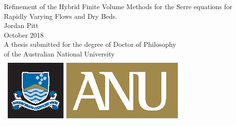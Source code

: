 \begin{titlepage}
\begin{center}

\vspace*{\fill} \Huge
                        Refinement of the Hybrid Finite Volume Methods for the Serre equations for Rapidly Varying Flows and Dry Beds.
\\
\vfill\vfill\Large
                          Jordan Pitt
\\
\vfill\vfill
                          October 2018
\\
\vfill\vfill \normalsize
         A thesis submitted for the degree of Doctor of Philosophy\\
         of the Australian National University
\vfill
         \includegraphics{ANU.eps}

\end{center}

\end{titlepage}
